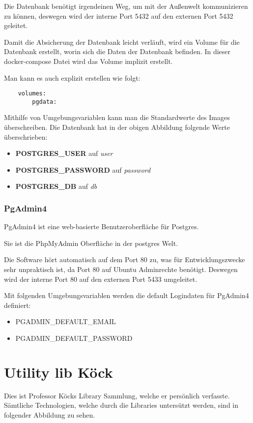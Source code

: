 Die Datenbank benötigt irgendeinen Weg, um mit der Außenwelt kommunizieren zu können, deswegen wird der interne Port 5432 auf den externen Port 5432 geleitet.

Damit die Absicherung der Datenbank leicht verläuft, wird ein Volume für die Datenbank erstellt, worin sich die Daten der Datenbank befinden. In dieser docker-compose Datei wird das Volume implizit erstellt. 

Man kann es auch explizit erstellen wie folgt:

\begin{verbatim}
    volumes:
        pgdata:
\end{verbatim}

Mithilfe von Umgebungsvariablen kann man die Standardwerte des Images überschreiben. Die Datenbank hat in der obigen Abbildung folgende Werte überschrieben:

\begin{itemize}
    \item \textbf{POSTGRES\_USER} auf \textit{user}
    \item \textbf{POSTGRES\_PASSWORD} auf \textit{password}
    \item \textbf{POSTGRES\_DB} auf \textit{db}
\end{itemize}

\subsubsection{PgAdmin4}

PgAdmin4 ist eine web-basierte Benutzeroberfläche für Postgres.

Sie ist die PhpMyAdmin Oberfläche in der postgres Welt.

Die Software hört automatisch auf dem Port 80 zu, was für Entwicklungszwecke sehr unpraktisch ist, da Port 80 auf Ubuntu Adminrechte benötigt. Deswegen wird der interne Port 80 auf den externen Port 5433 umgeleitet.

Mit folgenden Umgebungsvariablen werden die default Logindaten für PgAdmin4 definiert:

\begin{itemize}
    \item PGADMIN\_DEFAULT\_EMAIL
    \item PGADMIN\_DEFAULT\_PASSWORD
\end{itemize}

\pagebreak

\section{Utility lib Köck}\label{sec:utility-lib-koeck}
Dies ist Professor Köcks Library Sammlung, welche er persönlich verfasste. Sämtliche Technologien, welche durch die Libraries untersützt werden, sind in folgender Abbildung zu sehen.

